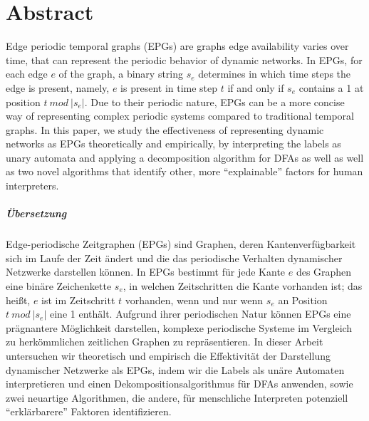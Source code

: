 \chapter*{Abstract}
Edge periodic temporal graphs (EPGs) are graphs edge availability varies over time, that can represent the periodic behavior of dynamic networks.
In EPGs, for each edge $e$ of the graph, a binary string $s_e$ determines in which time steps the edge is present, namely, $e$ is present in time step $t$ if and only if $s_e$ contains a 1 at position $t~ mod~ |s_e|$.
Due to their periodic nature, EPGs can be a more concise way of representing complex periodic systems compared to traditional temporal graphs.
In this paper, we study the effectiveness of representing dynamic networks as EPGs theoretically and empirically, by interpreting the labels as unary automata and applying a decomposition algorithm for DFAs as well as well as two novel algorithms that identify other, more \enquote{explainable} factors for human interpreters.

\paragraph{Übersetzung}
Edge-periodische Zeitgraphen (EPGs)  sind Graphen, deren Kantenverfügbarkeit sich im Laufe der Zeit ändert und die das periodische Verhalten dynamischer Netzwerke darstellen können.
In EPGs bestimmt für jede Kante $e$ des Graphen eine binäre Zeichenkette $s_e$, in welchen Zeitschritten die Kante vorhanden ist; das heißt, $e$ ist im Zeitschritt $t$ vorhanden, wenn und nur wenn $s_e$ an Position $t~ mod~ |s_e|$ eine 1 enthält.
Aufgrund ihrer periodischen Natur können EPGs eine prägnantere Möglichkeit darstellen, komplexe periodische Systeme im Vergleich zu herkömmlichen zeitlichen Graphen zu repräsentieren. In dieser Arbeit untersuchen wir theoretisch und empirisch die Effektivität der Darstellung dynamischer Netzwerke als EPGs, indem wir die Labels als unäre Automaten interpretieren und einen Dekompositionsalgorithmus für DFAs anwenden, sowie zwei neuartige Algorithmen, die andere, für menschliche Interpreten potenziell \enquote{erklärbarere} Faktoren identifizieren.